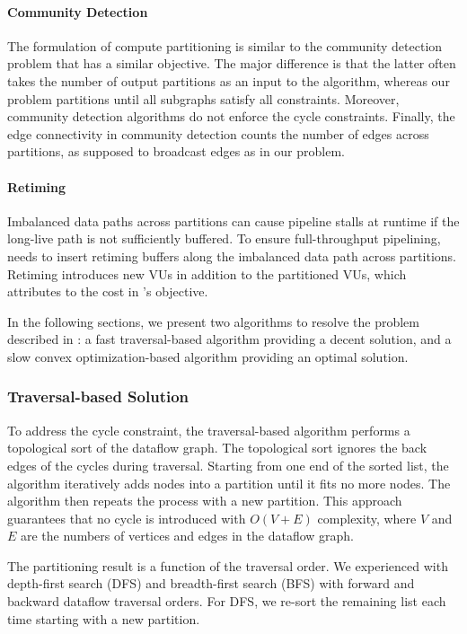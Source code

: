 \paragraph{Community Detection}
The formulation of compute partitioning is similar to the community detection
problem\cite{community} that has a similar objective. 
The major difference is that the latter often takes the number of output partitions as an
input to the algorithm, whereas our problem partitions until all subgraphs satisfy all constraints.
Moreover, community detection algorithms do not enforce the cycle constraints. 
Finally, the edge connectivity in community detection counts the number of edges across partitions, 
as supposed to broadcast edges as in our problem.

\paragraph{Retiming}
Imbalanced data paths across partitions can cause pipeline stalls at runtime if the long-live path is not
sufficiently buffered.
To ensure full-throughput pipelining, \name needs to insert retiming buffers along the imbalanced data path across
partitions.
Retiming introduces new VUs in addition to the partitioned VUs, which attributes to the cost in
's objective.

In the following sections, we present two algorithms to resolve the problem described in
:
a fast traversal-based algorithm providing a decent solution, and a slow convex
optimization-based algorithm providing an optimal solution.

\subsubsection{Traversal-based Solution}
To address the cycle constraint, the traversal-based algorithm performs a topological sort of the dataflow graph.
The topological sort ignores the back edges of the cycles during traversal. 
Starting from one end of the sorted list, the algorithm iteratively adds nodes into a partition
until it fits no more nodes. The algorithm then repeats the process with a new partition.
This approach guarantees that no cycle is introduced with $O(V+E)$ complexity, 
where $V$ and $E$ are the numbers of vertices and edges in the dataflow graph.

The partitioning result is a function of the traversal order.
We experienced with depth-first search (DFS) and breadth-first search (BFS) with forward and
backward dataflow traversal orders.
For DFS, we re-sort the remaining list each time starting with a new partition.

